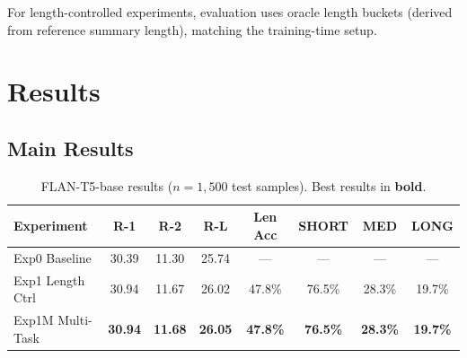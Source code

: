 \documentclass[11pt,a4paper]{article}
\begin{document}
For length-controlled experiments, evaluation uses oracle length buckets (derived from reference summary length), matching the training-time setup.

\section{Results}

\subsection{Main Results}

\begin{table}[t]
\centering
\caption{FLAN-T5-base results ($n = 1{,}500$ test samples). Best results in \textbf{bold}.}
\label{tab:flan-results}
\small
\begin{tabular}{@{}lccccccc@{}}
\toprule
\textbf{Experiment} & \textbf{R-1} & \textbf{R-2} & \textbf{R-L} & \textbf{Len Acc} & \textbf{SHORT} & \textbf{MED} & \textbf{LONG} \\
\midrule
Exp0 Baseline    & 30.39 & 11.30 & 25.74 & ---    & ---    & ---   & ---   \\
Exp1 Length Ctrl  & 30.94 & 11.67 & 26.02 & 47.8\% & 76.5\% & 28.3\% & 19.7\% \\
Exp1M Multi-Task & \textbf{30.94} & \textbf{11.68} & \textbf{26.05} & \textbf{47.8\%} & \textbf{76.5\%} & \textbf{28.3\%} & \textbf{19.7\%} \\
\bottomrule
\end{tabular}
\end{table}
\end{document}
